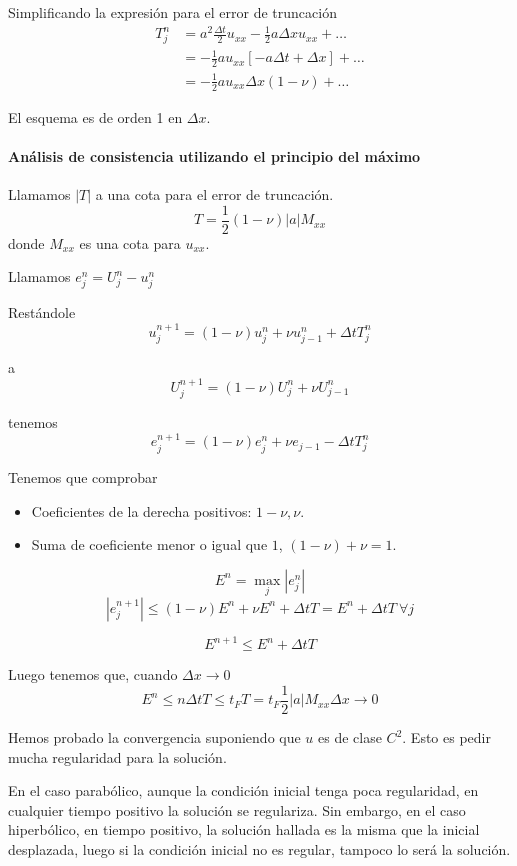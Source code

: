 Simplificando la expresión para el error de truncación
\begin{align*}
	T_j^n &= a^2\frac{\Delta t}{2}u_{xx} - \frac{1}{2}a \Delta x u_{xx} + \hdots \\
	&= -\frac{1}{2}au_{xx}\left[-a\Delta t + \Delta x\right] + \hdots \\
	&= -\frac{1}{2}au_{xx}\Delta x(1-\nu)+\hdots
\end{align*}

El esquema es de orden 1 en $\Delta x$.

\paragraph{Análisis de consistencia utilizando el principio del máximo}
Llamamos $|T|$ a una cota para el error de truncación.
$$T = \frac{1}{2}(1-\nu)|a|M_{xx}$$
donde $M_{xx}$ es una cota para $u_{xx}$.

Llamamos $e_j^n = U_j^n - u_j^n$

Restándole
$$u_{j}^{n+1} = (1-\nu)u_{j}^{n}+\nu u_{j-1}^{n}+\Delta tT_j^n$$

a
$$U_j^{n+1} = (1-\nu)U_j^n+\nu U_{j-1}^n$$

tenemos
$$e_j^{n+1} = (1-\nu)e_j^n +\nu e_{j-1}-\Delta t T_j^n$$

Tenemos que comprobar
\begin{itemize}
	\item Coeficientes de la derecha positivos: $1-\nu, \nu$.
	\item Suma de coeficiente menor o igual que $1$, $(1-\nu)+\nu = 1$.
\end{itemize}

$$E^n = \max_j |e_j^n|$$
$$|e_j^{n+1}| \le (1-\nu)E^n + \nu E^n + \Delta t T = E^n + \Delta t T \ \forall j$$

$$E^{n+1} \le E^n + \Delta t T$$

Luego tenemos que, cuando $\Delta x\to 0$
$$E^n \le n\Delta t T \le t_F T = t_F \frac{1}{2}|a|M_{xx}\Delta x \to 0$$

Hemos probado la convergencia suponiendo que $u$ es de clase $C^2$. Esto es pedir mucha regularidad para la solución.

En el caso parabólico, aunque la condición inicial tenga poca regularidad, en cualquier tiempo positivo la solución se regulariza. Sin embargo, en el caso hiperbólico, en tiempo positivo, la solución hallada es la misma que la inicial desplazada, luego si la condición inicial no es regular, tampoco lo será la solución.

